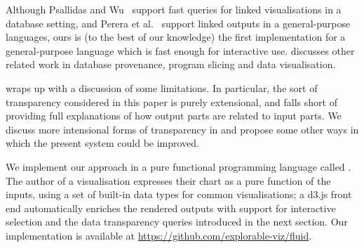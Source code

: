 \noindent Although Psallidas and Wu~\cite{psallidas18b} support fast queries for linked visualisations in a
database setting, and Perera et al.~\cite{perera22} support linked outputs in a general-purpose languages,
ours is (to the best of our knowledge) the first implementation for a general-purpose language which is fast
enough for interactive use.  discusses other related work in database provenance, program
slicing and data visualisation.

 wraps up with a discussion of some limitations. In particular, the sort of transparency
considered in this paper is purely extensional, and falls short of providing full explanations of how output
parts are related to input parts. We discuss more intensional forms of transparency in  and
propose some other ways in which the present system could be improved.

We implement our approach in a pure functional programming language called \OurLang. The author of a
visualisation expresses their chart as a pure function of the inputs, using a set of built-in data types for
common visualisations; a d3.js front end automatically enriches the rendered outputs with support for
interactive selection and the data transparency queries introduced in the next section. Our implementation is
available at \href{https://github.com/explorable-viz/fluid}{\textsf{https://github.com/explorable-viz/fluid}}.
